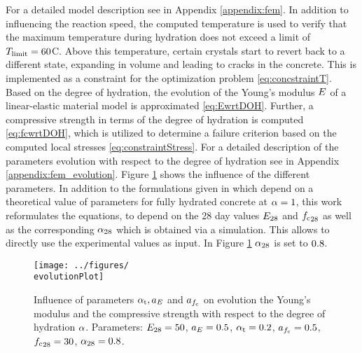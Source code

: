 For a detailed model description see in Appendix \ref{appendix:fem}.
In addition to influencing the reaction speed, the computed temperature is used to verify that the maximum temperature during hydration does not exceed a limit of $T_{\text{limit}} = 60$\textdegree C.
Above this temperature, certain crystals start to revert back to a different state, expanding in volume and leading to cracks in the concrete.
This is implemented as a constraint for the optimization problem \eqref{eq:concstraintT}.\\
Based on the degree of hydration, the evolution of the Young's modulus $E$ of a linear-elastic material model
is approximated \eqref{eq:EwrtDOH}.
Further, a compressive strength in terms of the degree of hydration is computed \eqref{eq:fcwrtDOH}, which is utilized to determine a failure criterion based on the computed local stresses \eqref{eq:constraintStress}.
For a detailed description of the parameters evolution with respect to the degree of hydration see in Appendix \ref{appendix:fem_evolution}.
Figure \ref{fig:parameterEvolution} shows the influence of the different parameters.
In addition to the formulations given in \cite{car_2016_mamt} which depend on a theoretical value of parameters for fully hydrated concrete at $\alpha = 1$, this work reformulates the equations, to depend on the 28 day values $E_{28}$ and ${f_{\text{c}}}_{28}$ as well as the corresponding $\alpha_{28}$ which is obtained via a simulation.
This allows to directly use the experimental values as input.
In Figure \ref{fig:parameterEvolution} $\alpha_{28}$ is set to $0.8$.\\
\begin{figure}[h]%
	\centering
	\texttt{[image: ../figures/\\evolutionPlot]}
	\caption{Influence of parameters $\alpha_{\text{t}}, a_{E}$ and $a_{f_{\text{c}}}$ on evolution the Young's modulus and the compressive strength with respect to the degree of hydration $\alpha$.
	Parameters: $E_{28} = 50$, $a_{E} = 0.5$, $\alpha_{\text{t}} = 0.2$, $a_{f_{\text{c}}} = 0.5$,  ${f_{\text{c}}}_{28} = 30$, $\alpha_{28} = 0.8$. \\
	}\label{fig:parameterEvolution} 
\end{figure}
